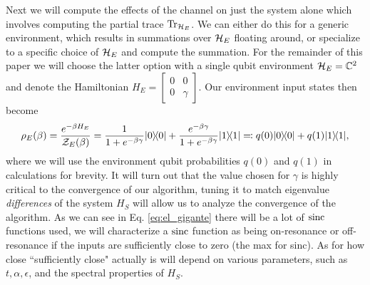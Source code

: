 Next we will compute the effects of the channel on just the system alone which involves computing the partial trace $\operatorname{Tr}_{\mathcal{H}_E}$. We can either do this for a generic environment, which results in summations over $\mathcal{H}_E$ floating around, or specialize to a specific choice of $\mathcal{H}_E$ and compute the summation. For the remainder of this paper we will choose the latter option with a single qubit environment $\mathcal{H}_E = \mathbb{C}^2$ and denote the Hamiltonian $H_E = \begin{bmatrix} 0 & 0 \\ 0 & \gamma \end{bmatrix}$. Our environment input states then become
\begin{equation}
    \rho_E(\beta) = \frac{e^{-\beta H_E}}{\mathcal{Z}_E(\beta)} = \frac{1}{1 + e^{-\beta \gamma}} | 0\rangle\! \langle 0| + \frac{e^{-\beta \gamma}}{1 + e^{-\beta \gamma}} | 1\rangle\! \langle 1| \eqqcolon q(0) | 0\rangle\! \langle 0| + q(1) | 1\rangle\! \langle 1| \label{eq:env_state_def},
\end{equation}
where we will use the environment qubit probabilities $q(0)$ and $q(1)$ in calculations for brevity. It will turn out that the value chosen for $\gamma$ is highly critical to the convergence of our algorithm, tuning it to match eigenvalue \emph{differences} of the system $H_S$ will allow us to analyze the convergence of the algorithm. As we can see in Eq. \eqref{eq:el_gigante} there will be a lot of $\operatorname{sinc}$ functions used, we will characterize a $\operatorname{sinc}$ function as being on-resonance or off-resonance if the inputs are sufficiently close to zero (the max for sinc). As for how close ``sufficiently close" actually is will depend on various parameters, such as $t, \alpha, \epsilon$, and the spectral properties of $H_S$.  
